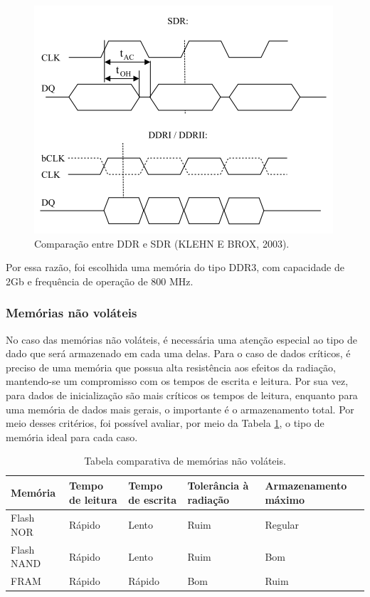 \begin{figure}[htp]
    \centering
    \includegraphics[scale=1]{images/ddrsdr.png}
    \caption{Comparação entre DDR e SDR (KLEHN E BROX, 2003).}
    \label{fig:sdrvsddr}
\end{figure}
 
Por essa razão, foi escolhida uma memória do tipo DDR3, com capacidade de 2Gb e frequência de operação de 800 MHz.

\subsubsection{Memórias não voláteis}

No caso das memórias não voláteis, é necessária uma atenção especial ao tipo de dado que será armazenado em cada uma delas. Para o caso de dados críticos, é preciso de uma memória que possua alta resistência aos efeitos da radiação, mantendo-se um compromisso com os tempos de escrita e leitura. Por sua vez, para dados de inicialização são mais críticos os tempos de leitura, enquanto para uma memória de dados mais gerais, o importante é o armazenamento total. Por meio desses critérios, foi possível avaliar, por meio da Tabela \ref{tab:memnvol}, o tipo de memória ideal para cada caso.

\begin{table}[H]
	\ABNTEXfontereduzida
	\caption{\label{tab:memnvol}Tabela comparativa de memórias não voláteis.}
    \centering
    \begin{tabular}{@{} >{\centering}p{2cm} >{\centering}p{3cm} >{\centering}p{3cm} >{\centering}p{3cm}>{\centering}p{3cm} @{}}
    
		\toprule
		\textbf{Memória} & \textbf{Tempo de leitura} & \textbf{Tempo de escrita} & \textbf{Tolerância à radiação} & \textbf{Armazenamento máximo} \tabularnewline 
        \midrule
        Flash NOR & Rápido & Lento & Ruim & Regular\tabularnewline
        
        \midrule
        Flash NAND & Rápido & Lento & Ruim & Bom \tabularnewline 

        \midrule
        FRAM & Rápido & Rápido & Bom & Ruim \tabularnewline 
        
        \bottomrule
	\end{tabular}
\end{table}


